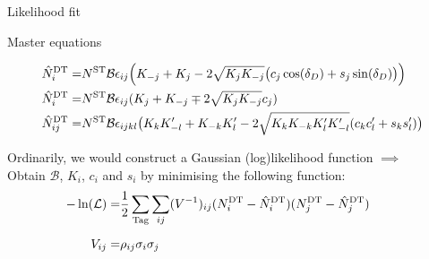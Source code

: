 \documentclass{beamer}
\begin{document}
\begin{frame}{Likelihood fit}
  \begin{block}{Master equations}
    \begin{center}
      \vspace{-0.5cm}
      \begin{align*}
        \hat{N}^{\rm DT}_i =& N^{\rm ST}\mathcal{B}\epsilon_{ij}\Big(K_{-j} + K_j - 2\sqrt{K_jK_{-j}}\big(c_j\cos(\delta_D) + s_j\sin(\delta_D)\big)\Big) \\
        \hat{N}^{\rm DT}_i =& N^{\rm ST}\mathcal{B}\epsilon_{ij}(K_j + K_{-j} \mp 2\sqrt{K_jK_{-j}}c_j) \\
        \hat{N}^{\rm DT}_{ij} =& N^{\rm ST}\mathcal{B}\epsilon_{ijkl}\big(K_{k}K_{-l}^\prime + K_{-k}K_{l}^\prime - 2\sqrt{K_{k}K_{-k}K_{l}^\prime K_{-l}^\prime}(c_{k}c_{l}^\prime + s_{k}s_{l}^\prime)\big)
      \end{align*}
    \end{center}
  \end{block}
  \vspace{0.5cm}
  \begin{center}
    Ordinarily, we would construct a Gaussian (log)likelihood function $\implies$\\
    Obtain $\mathcal{B}$, $K_i$, $c_i$ and $s_i$ by minimising the following function:
    \begin{align*}
      -\ln(\mathcal{L}) =& \frac{1}{2}\sum_{\rm Tag}\sum_{ij}(V^{-1})_{ij}(N^{\rm DT}_i - \hat{N}^{\rm DT}_i)(N^{\rm DT}_j - \hat{N}^{\rm DT}_j) \\
      V_{ij} =& \rho_{ij}\sigma_i\sigma_j\phantom{, \quad \sigma_i = \sqrt{\sigma_-\sigma_+ - (\sigma_+ - \sigma_-)(N^{\rm DT}_i - \hat{N}^{\rm DT})}}
    \end{align*}
  \end{center}
\end{frame}
\end{document}
